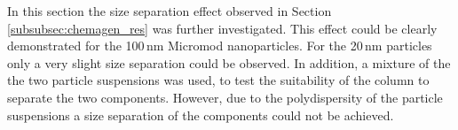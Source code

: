 In this section the size separation effect observed in Section\,\ref{subsubsec:chemagen_res} was further investigated. This effect could be clearly demonstrated for the 100\,nm Micromod nanoparticles. For the 20\,nm particles only a very slight size separation could be observed. In addition, a mixture of the the two particle suspensions was used, to test the suitability of the column to separate the two components. However, due to the polydispersity of the particle suspensions a size separation of the components could not be achieved.   